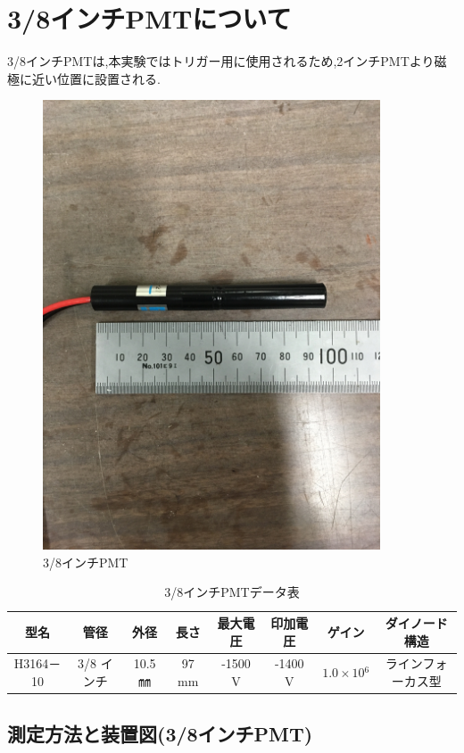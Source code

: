 \section{3/8インチPMTについて}
3/8インチPMT\cite{pmtR2248}は,本実験ではトリガー用に使用されるため,2インチPMTより磁極に近い位置に設置される.
\begin{figure}[H]
	\centering
		\includegraphics[width=10cm]{fig/iguchi/miniPMT.jpg}
	\caption{3/8インチPMT}
	\label{3/8inch}
\end{figure}
\begin{table}[htb]
	\centering
	
	  \begin{tabular}{cccccccc} \hline
		型名& 管径 & 外径 & 長さ & 最大電圧 & 印加電圧 & ゲイン & ダイノード構造 \\ \hline \hline
		H3164－10 & 3/8 インチ & 10.5 ㎜ & 97 mm & -1500 V & -1400 V & $1.0\times10{^{6}}$ &ラインフォーカス型 \\ \hline
	\end{tabular}
	  \caption{3/8インチPMTデータ表}
\end{table}


\subsection{測定方法と装置図(3/8インチPMT)}

